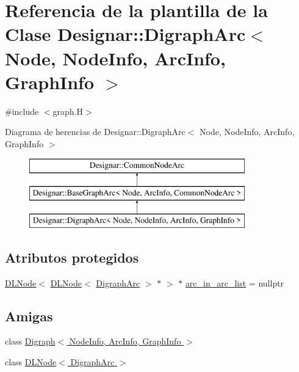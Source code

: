 \hypertarget{class_designar_1_1_digraph_arc}{}\section{Referencia de la plantilla de la Clase Designar\+:\+:Digraph\+Arc$<$ Node, Node\+Info, Arc\+Info, Graph\+Info $>$}
\label{class_designar_1_1_digraph_arc}


{\ttfamily \#include $<$graph.\+H$>$}

Diagrama de herencias de Designar\+:\+:Digraph\+Arc$<$ Node, Node\+Info, Arc\+Info, Graph\+Info $>$\begin{figure}[H]
\begin{center}
\leavevmode
\includegraphics[height=3.000000cm]{class_designar_1_1_digraph_arc}
\end{center}
\end{figure}
\subsection*{Atributos protegidos}
\begin{DoxyCompactItemize}
\item 
\hyperlink{class_designar_1_1_d_l_node}{D\+L\+Node}$<$ \hyperlink{class_designar_1_1_d_l_node}{D\+L\+Node}$<$ \hyperlink{class_designar_1_1_digraph_arc}{Digraph\+Arc} $>$ $\ast$ $>$ $\ast$ \hyperlink{class_designar_1_1_digraph_arc_a1b269dc44c4b3696cb79e86a97afbdd7}{arc\+\_\+in\+\_\+arc\+\_\+list} = nullptr
\end{DoxyCompactItemize}
\subsection*{Amigas}
\begin{DoxyCompactItemize}
\item 
class \hyperlink{class_designar_1_1_digraph_arc_abc8f370e4ec7084a6574cf967a5a5aaf}{Digraph$<$ Node\+Info, Arc\+Info, Graph\+Info $>$}
\item 
class \hyperlink{class_designar_1_1_digraph_arc_a1d0cecb0e630aa2aa8179b2afdd92a8b}{D\+L\+Node$<$ Digraph\+Arc $>$}
\end{DoxyCompactItemize}
